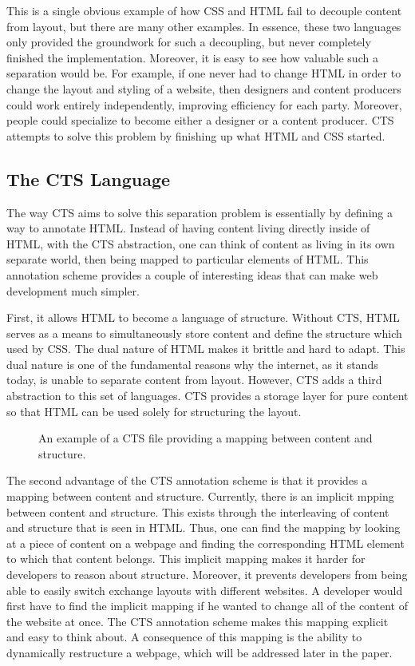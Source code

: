 \documentclass[12pt]{article}
\begin{document}
This is a single obvious example of how CSS and HTML fail to decouple content from layout, but there are many other examples. In essence, these two languages only provided the groundwork for such a decoupling, but never completely finished the implementation. Moreover, it is easy to see how valuable such a separation would be. For example, if one never had to change HTML in order to change the layout and styling of a website, then designers and content producers could work entirely independently, improving efficiency for each party. Moreover, people could specialize to become either a designer or a content producer. CTS attempts to solve this problem by finishing up what HTML and CSS started.

\subsection{The CTS Language}

The way CTS aims to solve this separation problem is essentially by defining a way to annotate HTML. Instead of having content living directly inside of HTML, with the CTS abstraction, one can think of content as living in its own separate world, then being mapped to particular elements of HTML. This annotation scheme provides a couple of interesting ideas that can make web development much simpler.

First, it allows HTML to become a language of structure. Without CTS, HTML serves as a means to simultaneously store content and define the structure which used by CSS. The dual nature of HTML makes it brittle and hard to adapt. This dual nature is one of the fundamental reasons why the internet, as it stands today, is unable to separate content from layout. However, CTS adds a third abstraction to this set of languages. CTS provides a storage layer for pure content so that HTML can be used solely for structuring the layout.

\begin{figure}
  \caption{An example of a CTS file providing a mapping between content and structure.}
\end{figure}

The second advantage of the CTS annotation scheme is that it provides a mapping between content and structure. Currently, there is an implicit mpping between content and structure. This exists through the interleaving of content and structure that is seen in HTML. Thus, one can find the mapping by looking at a piece of content on a webpage and finding the corresponding HTML element to which that content belongs. This implicit mapping makes it harder for developers to reason about structure. Moreover, it prevents developers from being able to easily switch exchange layouts with different websites. A developer would first have to find the implicit mapping if he wanted to change all of the content of the website at once. The CTS annotation scheme makes this mapping explicit and easy to think about. A consequence of this mapping is the ability to dynamically restructure a webpage, which will be addressed later in the paper.
\end{document}

